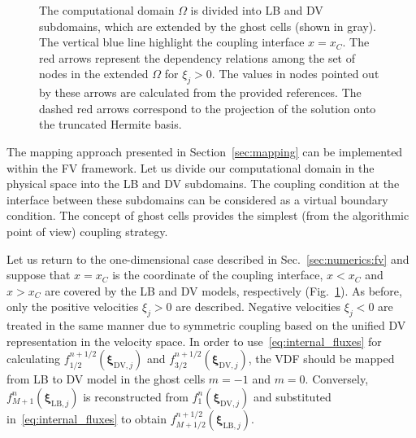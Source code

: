 \documentclass{elsarticle} %
\newcommand{\bxi}{\boldsymbol{\xi}}
\newcommand{\LB}{\mathrm{LB}}
\newcommand{\DV}{\mathrm{DV}}
\begin{document}
\begin{figure}
    \caption{
        The computational domain \(\Omega\) is divided into LB and DV subdomains,
        which are extended by the ghost cells (shown in gray).
        The vertical blue line highlight the coupling interface \(x=x_C\).
        The red arrows represent the dependency relations
        among the set of nodes in the extended \(\Omega\) for \(\xi_j>0\).
        The values in nodes pointed out by these arrows are calculated from the provided references.
        The dashed red arrows correspond to the projection of the solution onto the truncated Hermite basis.
    }
    \label{fig:coupling_scheme}
\end{figure}

The mapping approach presented in Section~\ref{sec:mapping} can be implemented within the FV framework.
Let us divide our computational domain in the physical space into the LB and DV subdomains.
The coupling condition at the interface between these subdomains can be considered as a virtual boundary condition.
The concept of ghost cells provides the simplest (from the algorithmic point of view) coupling strategy.

Let us return to the one-dimensional case described in Sec.~\ref{sec:numerics:fv}
and suppose that \(x=x_C\) is the coordinate of the coupling interface,
\(x<x_C\) and \(x>x_C\) are covered by the LB and DV models, respectively (Fig.~\ref{fig:coupling_scheme}).
As before, only the positive velocities \(\xi_j>0\) are described.
Negative velocities \(\xi_j<0\) are treated in the same manner due to
symmetric coupling based on the unified DV representation in the velocity space.
In order to use~\eqref{eq:internal_fluxes} for calculating \(f^{n+1/2}_{1/2}(\bxi_{\DV,j})\)
and \(f^{n+1/2}_{3/2}(\bxi_{\DV,j})\),
the VDF should be mapped from LB to DV model in the ghost cells \(m=-1\) and \(m=0\).
Conversely, \(f^n_{M+1}(\bxi_{\LB,j})\) is reconstructed from \(f^n_1(\bxi_{\DV,j})\)
and substituted in~\eqref{eq:internal_fluxes} to obtain \(f^{n+1/2}_{M+1/2}(\bxi_{\LB,j})\).
\end{document}
